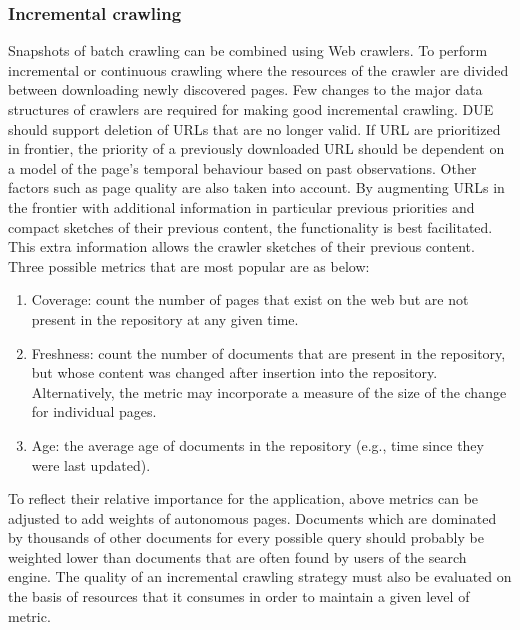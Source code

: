 \documentclass[article,type=msc,colorback,accentcolor=tud9c,twoside,11pt]{tudthesis}
\begin{document}
	\subsubsection{Incremental crawling}
	Snapshots of batch crawling can be combined using Web crawlers. To perform incremental or continuous crawling where the resources of the crawler are divided between downloading newly discovered pages. Few changes to the major data structures of crawlers are required for making good incremental crawling. DUE should support deletion of URLs that are no longer valid. If URL are prioritized in frontier, the priority of a previously downloaded URL should be dependent on a model of the page's temporal behaviour based on past observations. Other factors such as page quality are also taken into account. By augmenting URLs in the frontier with additional information in particular previous priorities and compact sketches of their previous content, the functionality is best facilitated. This extra information allows the crawler sketches of their previous content. Three possible metrics that are most popular are as below:
	\begin{enumerate}
		\item Coverage: count the number of pages that exist on the web but are not present in the repository at any given time.
		\item Freshness: count the number of documents that are present in the repository, but whose content was
		changed after insertion into the repository. Alternatively, the metric may incorporate a measure of the
		size of the change for individual pages.
		\item Age: the average age of documents in the repository (e.g., time since they were last updated).
	\end{enumerate}
	To reflect their relative importance for the application, above metrics can be adjusted to add weights of autonomous pages. Documents which are dominated by thousands of other documents for every possible query should probably be weighted lower than documents that are often found by users of the search engine. The quality of an incremental crawling strategy must also be evaluated on the basis of resources that it consumes in order to maintain a given level of metric.
\end{document}
